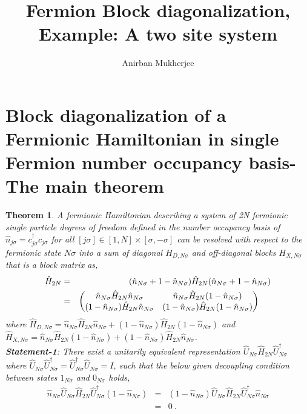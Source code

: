 \documentclass[12pt,a4paper]{article}
\author{Anirban Mukherjee}
\title{Fermion Block diagonalization, Example: A two site system}
\newtheorem{theorem}{Theorem}
\begin{document}
\maketitle
\section{Block diagonalization of a Fermionic Hamiltonian in single Fermion number occupancy basis-The main theorem}
\begin{theorem}
A fermionic Hamiltonian describing a system of 2N fermionic single particle degrees of freedom defined in the number occupancy basis of $\hat{n}_{j\sigma}=c^{\dagger}_{j\sigma}c_{j\sigma}$ for all $[j\sigma] \in [1,N]\times  [\sigma , -\sigma]$ can be resolved with respect to the fermionic state $N\sigma$ into a sum of diagonal $H_{D,N\sigma}$ and off-diagonal blocks $H_{X,N\sigma}$ that is a block matrix as,
\begin{eqnarray}
\hat{H}_{2N} &=& (\hat{n}_{N\sigma}+1-\hat{n}_{N\sigma})\hat{H}_{2N}(\hat{n}_{N\sigma}+1-\hat{n}_{N\sigma})\nonumber\\
&=&\begin{pmatrix}
\hat{n}_{N\sigma}\hat{H}_{2N}\hat{n}_{N\sigma} & \hat{n}_{N\sigma}\hat{H}_{2N}(1-\hat{n}_{N\sigma})\\
(1-\hat{n}_{N\sigma})\hat{H}_{2N}\hat{n}_{N\sigma} & (1-\hat{n}_{N\sigma})\hat{H}_{2N}(1-\hat{n}_{N\sigma})
\end{pmatrix}\hspace*{0.5cm}
\end{eqnarray}
where $\hat{H}_{D,N\sigma}= \hat{n}_{N\sigma}\hat{H}_{2N}\hat{n}_{N\sigma}+(1-\hat{n}_{N\sigma})\hat{H}_{2N}(1-\hat{n}_{N\sigma})$ and  $\hat{H}_{X,N\sigma} = \hat{n}_{N\sigma}\hat{H}_{2N}(1-\hat{n}_{N\sigma})+(1-\hat{n}_{N\sigma})\hat{H}_{2N}\hat{n}_{N\sigma}$.\\
\textbf{Statement-1}: There exist a unitarily equivalent representation $\hat{U}_{N\sigma}\hat{H}_{2N}\hat{U}^{\dagger}_{N\sigma}$ where $\hat{U}_{N\sigma}\hat{U}^{\dagger}_{N\sigma}=\hat{U}^{\dagger}_{N\sigma}\hat{U}_{N\sigma}=I$, such that the below  given  decoupling condition between states $1_{N\sigma}$ and $0_{N\sigma}$ holds,
\begin{eqnarray}
\hat{n}_{N\sigma}\hat{U}_{N\sigma}\hat{H}_{2N}\hat{U}^{\dagger}_{N\sigma}(1-\hat{n}_{N\sigma}) &=& (1-\hat{n}_{N\sigma})\hat{U}_{N\sigma}\hat{H}_{2N}\hat{U}^{\dagger}_{N\sigma}\hat{n}_{N\sigma} \nonumber\\
&=& 0 ~.\nonumber
\end{eqnarray}

\end{theorem}
\end{document}
